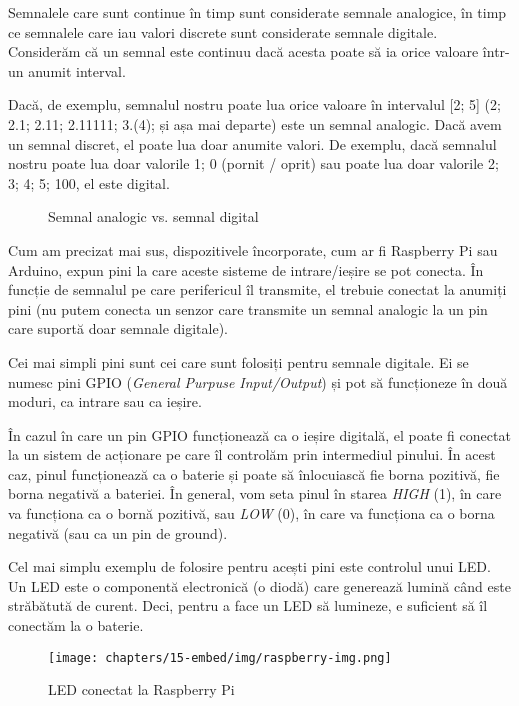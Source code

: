 Semnalele care sunt continue în timp sunt considerate semnale analogice, în timp
ce semnalele care iau valori discrete sunt considerate semnale digitale.
Considerăm că un semnal este continuu dacă acesta poate să ia orice valoare
într-un anumit interval.

Dacă, de exemplu, semnalul nostru poate lua orice valoare în intervalul [2; 5]
(2; 2.1; 2.11; 2.11111; 3.(4); și așa mai departe) este un semnal analogic. Dacă
avem un semnal discret, el poate lua doar anumite valori. De exemplu, dacă
semnalul nostru poate lua doar valorile {1; 0} (pornit / oprit) sau poate lua
doar valorile {2; 3; 4; 5; 100}, el este digital.

\begin{figure}[htbp]
	\centering
	\def\svgwidth{\columnwidth}
	
	\caption{Semnal analogic vs. semnal digital}
	\label{fig:embed-analog-digital}
\end{figure}

Cum am precizat mai sus, dispozitivele încorporate, cum ar fi Raspberry Pi sau
Arduino, expun pini la care aceste sisteme de intrare/ieșire se pot conecta. În
funcție de semnalul pe care perifericul îl transmite, el trebuie conectat la
anumiți pini (nu putem conecta un senzor care transmite un semnal analogic la un
pin care suportă doar semnale digitale).

Cei mai simpli pini sunt cei care sunt folosiți pentru semnale digitale. Ei se numesc pini
GPIO (\textit{General Purpuse Input/Output}) și pot să funcționeze în două moduri, ca
intrare sau ca ieșire.

În cazul în care un pin GPIO funcționează ca o ieșire digitală, el poate fi
conectat la un sistem de acționare pe care îl controlăm prin intermediul
pinului. În acest caz, pinul funcționează ca o baterie și poate să înlocuiască
fie borna pozitivă, fie borna negativă a bateriei. În general, vom seta pinul în
starea \textit{HIGH} (1), în care va funcționa ca o bornă pozitivă, sau \textit{LOW} (0), în care
va funcționa ca o borna negativă (sau ca un pin de ground).

Cel mai simplu exemplu de folosire pentru acești pini este controlul unui LED.
Un LED este o componentă electronică (o diodă) care generează lumină când este
străbătută de curent. Deci, pentru a face un LED să lumineze, e suficient să îl
conectăm la o baterie.

\begin{figure}[!htbp]
	\centering
	\texttt{[image: chapters/15-embed/img/raspberry-img.png]}
        \caption{LED conectat la Raspberry Pi}
	\label{fig:embed:raspberry}
\end{figure}

